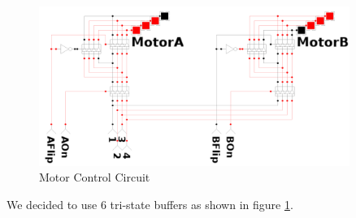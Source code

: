 \begin{figure}[htp]
	\centering
	\includegraphics[width=0.9\textwidth]{figures/move/direction_choice}
	\caption{Motor Control Circuit}
	\label{fig:mot_ctrl}
\end{figure}

We decided to use 6 tri-state buffers as shown in figure \ref{fig:mot_ctrl}.
